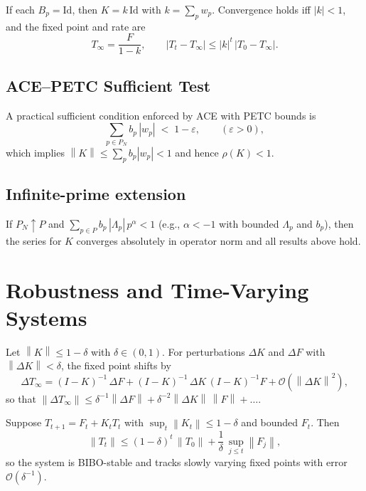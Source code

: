 \documentclass[11pt]{article}
\theoremstyle{definition}
\theoremstyle{remark}
\newcommand{\norm}[1]{\left\lVert #1\right\rVert}
\newcommand{\1}{\mathbf{1}}
\newcommand{\Id}{\mathrm{Id}}
\begin{document}
\begin{corollary}
If each $B_p=\Id$, then $K=k\,\Id$ with $k=\sum_p w_p$. Convergence holds iff $|k|<1$, and the fixed point and rate are
\[
  T_\infty = \frac{F}{1-k}, \qquad |T_t-T_\infty| \le |k|^t\,|T_0-T_\infty|.
\]
\end{corollary}

\subsection{ACE--PETC Sufficient Test}
A practical sufficient condition enforced by ACE with PETC bounds is
\begin{equation}
  \sum_{p\in P_N} b_p\,|w_p|\; <\; 1-\varepsilon, \qquad (\varepsilon>0),
  \label{eq:ace-budget}
\end{equation}
which implies $\norm{K}\le \sum_p b_p|w_p| < 1$ and hence $\rho(K)<1$.

\subsection{Infinite-prime extension}
If $P_N\uparrow P$ and $\sum_{p\in P} b_p\,|\Lambda_p|\,p^{\alpha} < 1$ (e.g., $\alpha<-1$ with bounded $\Lambda_p$ and $b_p$), then the series for $K$ converges absolutely in operator norm and all results above hold.

\section{Robustness and Time-Varying Systems}
\begin{proposition}
Let $\norm{K}\le 1-\delta$ with $\delta\in(0,1)$. For perturbations $\Delta K$ and $\Delta F$ with $\norm{\Delta K}<\delta$, the fixed point shifts by
\[
  \Delta T_\infty = (I-K)^{-1}\,\Delta F + (I-K)^{-1}\,\Delta K\,(I-K)^{-1}F + \mathcal{O}(\norm{\Delta K}^2),
\]
so that $\norm{\Delta T_\infty}\le \delta^{-1}\norm{\Delta F} + \delta^{-2}\norm{\Delta K}\,\norm{F}+\ldots$.
\end{proposition}

\begin{theorem}
Suppose $T_{t+1}=F_t+K_t T_t$ with $\sup_t\norm{K_t}\le 1-\delta$ and bounded $F_t$. Then
\[
  \norm{T_t}\le (1-\delta)^t\,\norm{T_0} + \frac{1}{\delta}\,\sup_{j\le t}\norm{F_j},
\]
so the system is BIBO-stable and tracks slowly varying fixed points with error $\mathcal{O}(\delta^{-1})$.
\end{theorem}
\end{document}
